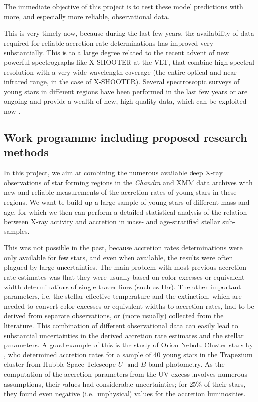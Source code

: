 \documentclass[10pt,fleqn,twoside]{article}
\begin{document}
\begin{highlight}
The immediate objective of this project is to test these model predictions with more, and especially
more reliable, observational data.
\end{highlight}
%
This is very timely now, because during the last few years,
the availability of data required for
reliable accretion rate determinations  has improved very substantially.
This is to a large degree related to
the recent advent of new powerful spectrographs like
X-SHOOTER at the VLT, that combine high spectral resolution
with a very wide wavelength coverage (the entire optical and
near-infrared range, in the case of X-SHOOTER).
Several spectroscopic surveys of young stars in different regions
have been performed in the last few years or are ongoing and provide a wealth
of new, high-quality data, which can be exploited now
\citep[see][]{MT14}.






\subsection{Work programme including proposed research methods}





In this project, we aim at combining the numerous available deep
X-ray observations of star forming regions in the \textit{Chandra} 
and XMM data
archives with new and reliable measurements of the accretion 
rates of young stars in these regions.
We want to build up a large sample of young stars of different mass
and  age,
for which we then can perform a detailed statistical analysis
of the relation between X-ray activity and accretion in mass- 
and age-stratified stellar sub-samples. 


This was not possible in the past, because accretion rates determinations were only
available for few stars, and even when available, the results were often
plagued by large uncertainties.
%
The main problem with most  previous accretion rate estimates was
 that they were usually
based on color excesses or equivalent-width determinations of single tracer lines
(such as H$\alpha$). The other important parameters, i.e. the  stellar effective
temperature and the extinction, which are needed to convert color excesses or
equivalent-widths to accretion rates, had to be derived from separate observations,
or (more usually) collected from the literature.
This combination of different observational data can easily lead to
substantial uncertainties in the derived accretion rate estimates and the stellar parameters.
%
%
A good example of this is the  study of Orion Nebula Cluster stars by \citet{Robberto04},
who determined
accretion rates for a sample of 40
young stars in the Trapezium cluster from Hubble Space Telescope $U$- and $B$-band photometry.
As the computation of the accretion parameters                          
from the UV excess 
involves numerous assumptions, their values had
considerable uncertainties; for 25\% of their
stars, they found even negative (i.e.~unphysical) values for the accretion luminosities.
\end{document}
